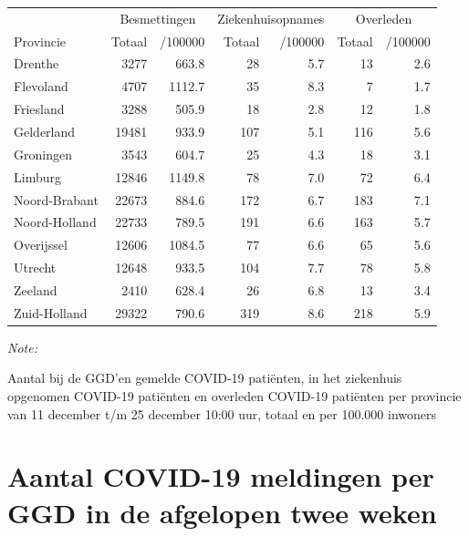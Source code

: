\documentclass[
  english,
  man,floatsintext]{apa6}
\begin{document}
\begin{table}[H]
\centering
\begin{threeparttable}
\begin{tabular}{lrrrrrr}
\toprule
\multicolumn{1}{c}{ } & \multicolumn{2}{c}{Besmettingen} & \multicolumn{2}{c}{Ziekenhuisopnames} & \multicolumn{2}{c}{Overleden} \\
\cmidrule(l{3pt}r{3pt}){2-3} \cmidrule(l{3pt}r{3pt}){4-5} \cmidrule(l{3pt}r{3pt}){6-7}
Provincie & Totaal & /100000 & Totaal & /100000 & Totaal & /100000\\
\midrule
Drenthe & 3277 & 663.8 & 28 & 5.7 & 13 & 2.6\\
Flevoland & 4707 & 1112.7 & 35 & 8.3 & 7 & 1.7\\
Friesland & 3288 & 505.9 & 18 & 2.8 & 12 & 1.8\\
Gelderland & 19481 & 933.9 & 107 & 5.1 & 116 & 5.6\\
Groningen & 3543 & 604.7 & 25 & 4.3 & 18 & 3.1\\
Limburg & 12846 & 1149.8 & 78 & 7.0 & 72 & 6.4\\
Noord-Brabant & 22673 & 884.6 & 172 & 6.7 & 183 & 7.1\\
Noord-Holland & 22733 & 789.5 & 191 & 6.6 & 163 & 5.7\\
Overijssel & 12606 & 1084.5 & 77 & 6.6 & 65 & 5.6\\
Utrecht & 12648 & 933.5 & 104 & 7.7 & 78 & 5.8\\
Zeeland & 2410 & 628.4 & 26 & 6.8 & 13 & 3.4\\
Zuid-Holland & 29322 & 790.6 & 319 & 8.6 & 218 & 5.9\\
\bottomrule
\end{tabular}
\begin{tablenotes}
\item \textit{Note: } 
\item Aantal bij de GGD’en gemelde COVID-19 patiënten, in het ziekenhuis opgenomen COVID-19 patiënten en overleden COVID-19 patiënten per provincie van 11 december t/m 25 december 10:00 uur, totaal en per 100.000 inwoners
\end{tablenotes}
\end{threeparttable}
\end{table}

\newpage

\hypertarget{aantal-covid-19-meldingen-per-ggd-in-de-afgelopen-twee-weken}{%
\section{Aantal COVID-19 meldingen per GGD in de afgelopen twee weken}\label{aantal-covid-19-meldingen-per-ggd-in-de-afgelopen-twee-weken}}
\end{document}
